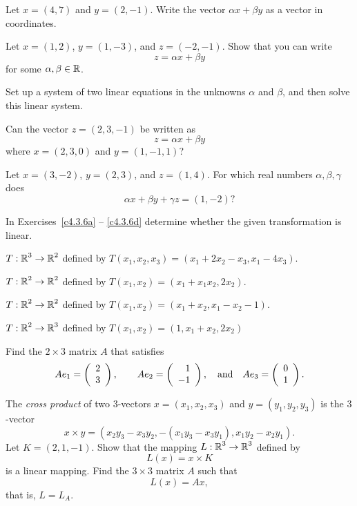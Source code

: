 \documentclass{ximera}
\begin{document}
\begin{exercise} \label{c4.3.2}
Let $x=(4,7)$ and $y=(2,-1)$.  Write the vector $\alpha x+\beta
y$ as a vector in coordinates.
\end{exercise}

\begin{exercise} \label{c4.3.3}
Let $x=(1,2)$, $y=(1,-3)$, and $z=(-2,-1)$.  Show that you can
write
\[
z=\alpha x+ \beta y
\]
for some $\alpha,\beta\in\mbox{$\Bbb{R}$}$.

 Set up a system of two linear equations in
the unknowns $\alpha$ and $\beta$, and then solve this linear
system.
\end{exercise}

\begin{exercise} \label{c4.3.4}
Can the vector $z=(2,3,-1)$ be written as
\[
z=\alpha x+ \beta y
\]
where $x=(2,3,0)$ and $y=(1,-1,1)$?
\end{exercise}

\begin{exercise} \label{c4.3.5}
Let $x=(3,-2)$, $y=(2,3)$, and $z=(1,4)$.  For which real
numbers $\alpha,\beta,\gamma$ does
\[
\alpha x + \beta y + \gamma z = (1,-2)?
\]
\end{exercise}

\noindent In Exercises~\ref{c4.3.6a} -- \ref{c4.3.6d} determine
whether the given transformation is linear.
\begin{exercise} \label{c4.3.6a}
  $T:\mbox{$\Bbb{R}$}^3\to\mbox{$\Bbb{R}$}^2$ defined by $T(x_1,x_2,x_3)=(x_1+2x_2-x_3,x_1-4x_3)$.
\end{exercise}
\begin{exercise} \label{c4.3.6b}
  $T:\mbox{$\Bbb{R}$}^2\to\mbox{$\Bbb{R}$}^2$ defined by $T(x_1,x_2)=(x_1+x_1x_2,2x_2)$.
\end{exercise}
\begin{exercise} \label{c4.3.6c}
  $T:\mbox{$\Bbb{R}$}^2\to\mbox{$\Bbb{R}$}^2$ defined by $T(x_1,x_2)=(x_1+x_2,x_1-x_2-1)$.
\end{exercise}
\begin{exercise} \label{c4.3.6d}
  $T:\mbox{$\Bbb{R}$}^2\to\mbox{$\Bbb{R}$}^3$ defined by $T(x_1,x_2)=(1,x_1+x_2,2x_2)$
\end{exercise}

\begin{exercise} \label{c4.3.7}
Find the $2\times 3$ matrix $A$ that satisfies
\[
Ae_1  =  \left(\begin{array}{r} 2 \\ 3\end{array}\right),\qquad
Ae_2  =  \left(\begin{array}{r} 1 \\ -1\end{array}\right), \quad\mbox{and}\quad
Ae_3  = \left(\begin{array}{r} 0 \\ 1\end{array}\right).
\]
\end{exercise}

\begin{exercise} \label{c4.3.8}
The {\em cross product\/} of two $3$-vectors $x=(x_1,x_2,x_3)$
and $y=(y_1,y_2,y_3)$ is the $3$-vector
\[
x\times y = (x_2y_3-x_3y_2,-(x_1y_3-x_3y_1),x_1y_2-x_2y_1).
\]
Let $K=(2,1,-1)$.  Show that the mapping $L:\mbox{$\Bbb{R}$}^3\to\mbox{$\Bbb{R}$}^3$ defined by
\[
L(x) = x\times K
\]
is a linear mapping.  Find the $3\times 3$ matrix $A$ such that
\[
L(x) = Ax,
\]
that is, $L=L_A$.
\end{exercise}
\end{document}
